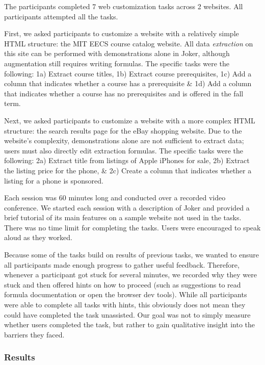 \documentclass[conference]{IEEEtran}
\begin{document}
The participants completed 7 web customization tasks across 2 websites.
All participants attempted all the tasks.

First, we asked participants to customize a website with a relatively
simple HTML structure: the MIT EECS course catalog website. All data
\emph{extraction} on this site can be performed with demonstrations
alone in Joker, although augmentation still requires writing formulas.
The specific tasks were the following: 1a) Extract course titles, 1b)
Extract course prerequisites, 1c) Add a column that indicates whether a
course has a prerequisite \& 1d) Add a column that indicates whether a
course has no prerequisites and is offered in the fall term.

Next, we asked participants to customize a website with a more complex
HTML structure: the search results page for the eBay shopping website.
Due to the website's complexity, demonstrations alone are not sufficient
to extract data; users must also directly edit extraction formulas. The
specific tasks were the following: 2a) Extract title from listings of
Apple iPhones for sale, 2b) Extract the listing price for the phone, \&
2c) Create a column that indicates whether a listing for a phone is
sponsored.

Each session was 60 minutes long and conducted over a recorded video
conference. We started each session with a description of Joker and
provided a brief tutorial of its main features on a sample website not
used in the tasks. There was no time limit for completing the tasks.
Users were encouraged to speak aloud as they worked.

Because some of the tasks build on results of previous tasks, we wanted
to ensure all participants made enough progress to gather useful
feedback. Therefore, whenever a participant got stuck for several
minutes, we recorded why they were stuck and then offered hints on how
to proceed (such as suggestions to read formula documentation or open
the browser dev tools). While all participants were able to complete all
tasks with hints, this obviously does not mean they could have completed
the task unassisted. Our goal was not to simply measure whether users
completed the task, but rather to gain qualitative insight into the
barriers they faced.

\hypertarget{results}{%
\subsubsection{Results}\label{results}}
\end{document}
